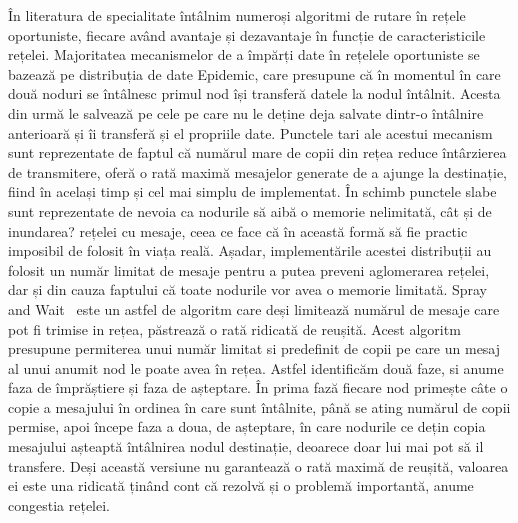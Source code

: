 \documentclass[12pt,a4paper]{report}
\begin{document}
În literatura de specialitate întâlnim numeroși algoritmi de rutare în rețele oportuniste, fiecare având avantaje și dezavantaje în funcție de caracteristicile rețelei. Majoritatea mecanismelor de a împărți date în rețelele oportuniste se bazează pe distribuția de date Epidemic, care presupune că în momentul în care două noduri se întâlnesc primul nod își transferă datele la nodul întâlnit.  Acesta din urmă le salvează pe cele pe care nu le deține deja salvate dintr-o întâlnire anterioară și îi transferă și el propriile date. Punctele tari ale acestui mecanism sunt reprezentate de faptul că numărul mare de copii din rețea reduce întârzierea de transmitere, oferă o rată maximă mesajelor generate de a ajunge la destinație, fiind în același timp și cel mai simplu de implementat. În schimb punctele slabe sunt reprezentate de nevoia ca nodurile să aibă o memorie nelimitată, cât și de inundarea? rețelei cu mesaje, ceea ce face că în această formă să fie practic imposibil de folosit în viața reală. Așadar, implementările acestei distribuții au folosit un număr limitat de mesaje pentru a putea preveni aglomerarea rețelei, dar și din cauza faptului că toate nodurile vor avea o memorie limitată. Spray and Wait~\cite{SprayAndWait} este un astfel de algoritm care deși limitează numărul de mesaje care pot fi trimise in rețea, păstrează o rată ridicată de reușită. Acest algoritm presupune permiterea unui număr limitat si predefinit de copii pe care un mesaj al unui anumit nod le poate avea în rețea. Astfel identificăm două faze, si anume faza de împrăștiere și faza de așteptare. În prima fază fiecare nod primește câte o copie a mesajului în ordinea în care sunt întâlnite, până se ating numărul de copii permise, apoi începe faza a doua, de așteptare, în care nodurile ce dețin copia mesajului așteaptă întâlnirea nodul destinație, deoarece doar lui mai pot să il transfere. Deși această versiune nu garantează o rată maximă de reușită, valoarea ei este una ridicată ținând cont că rezolvă și o problemă importantă, anume congestia rețelei. 
\end{document}
